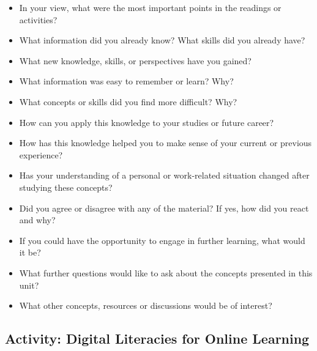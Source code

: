 \documentclass[
]{book}
\providecommand{\tightlist}{%
  \setlength{\itemsep}{0pt}\setlength{\parskip}{0pt}}
\theoremstyle{definition}
\theoremstyle{definition}
\theoremstyle{definition}
\theoremstyle{definition}
\theoremstyle{remark}
\begin{document}
\begin{reflect}
\begin{itemize}
\tightlist
\item
  In your view, what were the most important points in the readings or activities?\\
\item
  What information did you already know? What skills did you already have?
\item
  What new knowledge, skills, or perspectives have you gained?\\
\item
  What information was easy to remember or learn? Why?\\
\item
  What concepts or skills did you find more difficult? Why?\\
\item
  How can you apply this knowledge to your studies or future career?\\
\item
  How has this knowledge helped you to make sense of your current or previous experience?\\
\item
  Has your understanding of a personal or work-related situation changed after studying these concepts?\\
\item
  Did you agree or disagree with any of the material? If yes, how did you react and why?\\
\item
  If you could have the opportunity to engage in further learning, what would it be?\\
\item
  What further questions would like to ask about the concepts presented in this unit?\\
\item
  What other concepts, resources or discussions would be of interest?
\end{itemize}
\end{reflect}

\hypertarget{activity-digital-literacies-for-online-learning}{%
\subsection*{Activity: Digital Literacies for Online Learning}\label{activity-digital-literacies-for-online-learning}}
\end{document}
